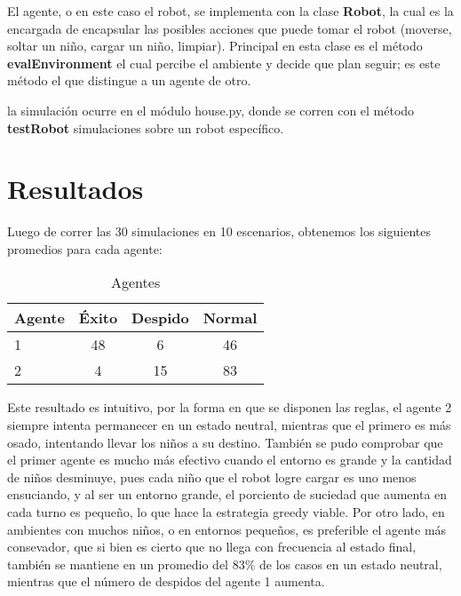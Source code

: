 \documentclass[a4paper, 12pt]{article}
\begin{document}
El agente, o en este caso el robot, se implementa con la clase \textbf{Robot}, la cual es la encargada de encapsular las posibles
acciones que puede tomar el robot (moverse, soltar un niño, cargar un niño, limpiar). Principal en esta clase es el m\'etodo
\textbf{evalEnvironment} el cual percibe el ambiente y decide que plan seguir; es este m\'etodo el que distingue a un agente de otro.


la simulaci\'on ocurre en el m\'odulo house.py, donde se corren con el m\'etodo \textbf{testRobot} simulaciones sobre un robot
espec\'ifico.

\section*{Resultados}
Luego de correr las 30 simulaciones en 10 escenarios, obtenemos los siguientes
promedios para cada agente:

\begin{table}[h!]
  \begin{center}
    \caption{Agentes}
    \label{tab:table1}
    \begin{tabular}{l|c|c|c} %
      \textbf{Agente} & \textbf{\'Exito} & \textbf{Despido} & \textbf{Normal}\\
      \hline
      1 & 48 & 6 & 46\\
      2 & 4 & 15 & 83\\
    \end{tabular}
  \end{center}
\end{table}

Este resultado es intuitivo, por la forma en que se disponen las reglas, el agente 2 siempre
intenta permanecer en un estado neutral, mientras que el primero es m\'as osado, intentando llevar
los niños a su destino. Tambi\'en se pudo comprobar que el primer agente es mucho m\'as efectivo cuando
el entorno es grande y la cantidad de niños desminuye, pues cada niño que el robot logre cargar
es uno menos ensuciando, y al ser un entorno grande, el porciento de suciedad que aumenta en cada
turno es pequeño, lo que hace la estrategia greedy viable. Por otro lado, en ambientes con muchos niños, o
en entornos pequeños, es preferible el agente m\'as consevador, que si bien es cierto que no llega con frecuencia
al estado final, tambi\'en se mantiene en un promedio del 83\% de los casos en un estado neutral, mientras que 
el n\'umero de despidos del agente 1 aumenta.
\end{document}
